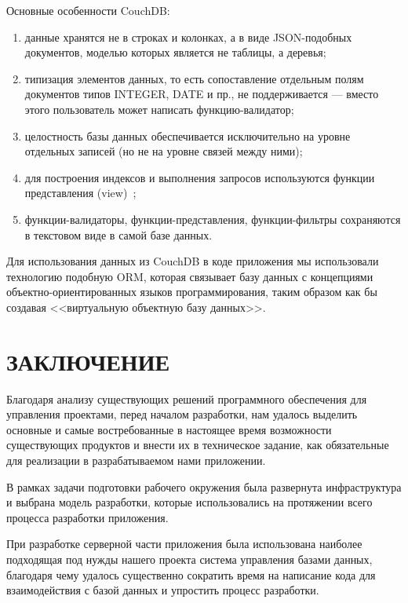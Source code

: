 \documentclass[14pt, a4paper]{extreport}
\begin{document}
Основные особенности CouchDB:
\begin{enumerate}
\item данные хранятся не в строках и колонках, а в виде JSON-подобных документов,
  моделью которых является не таблицы, а деревья;
\item типизация элементов данных, то есть сопоставление отдельным полям документов типов INTEGER, DATE и пр.,
  не поддерживается — вместо этого пользователь может написать функцию-валидатор;
\item целостность базы данных обеспечивается исключительно на уровне отдельных записей
  (но не на уровне связей между ними);
\item для построения индексов и выполнения запросов используются функции представления (view)~\cite{couchdb_doc};
\item функции-валидаторы, функции-представления, функции-фильтры сохраняются в текстовом виде в самой базе данных.
\end{enumerate}

Для использования данных из CouchDB в коде приложения мы использовали технологию подобную ORM,
которая связывает базу данных с концепциями объектно-ориентированных языков программирования,
таким образом как бы создавая <<виртуальную объектную базу данных>>.

\chapter{\MakeTextUppercase{Заключение}}
Благодаря анализу существующих решений программного обеспечения для управления проектами,
перед началом разработки, нам удалось выделить основные и самые востребованные в настоящее
время возможности существующих продуктов и внести их в техническое задание, как обязательные
для реализации в разрабатываемом нами приложении.

В рамках задачи подготовки рабочего окружения была развернута инфраструктура и выбрана
модель разработки, которые использовались на протяжении всего процесса разработки приложения.

При разработке серверной части приложения была использована наиболее подходящая под нужды
нашего проекта система управления базами данных, благодаря чему удалось существенно сократить
время на написание кода для взаимодействия с базой данных и упростить процесс разработки.
\end{document}
